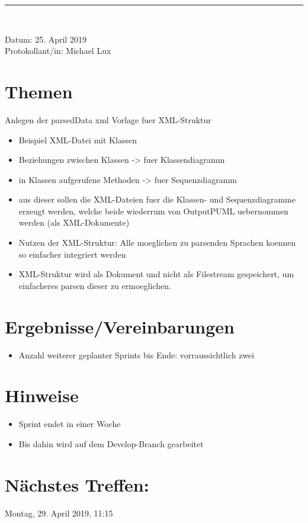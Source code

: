 \pagebreak
\begin{center}  
\vspace{0.5pt}\nointerlineskip\rule{\textwidth}{0.2pt}\\ 
\vspace{0.5pt}\nointerlineskip
\end{center} 
\large Datum: 25. April 2019\vspace{3pt}\\\large Protokollant/in: Michael Lux
\section{Themen}
Anlegen der parsedData xml Vorlage fuer XML-Struktur
\begin{itemize}

\item Beispiel XML-Datei mit Klassen
\item Beziehungen zwischen Klassen -> fuer Klassendiagramm
\item in Klassen aufgerufene Methoden -> fuer Sequenzdiagramm

\item aus dieser sollen die XML-Dateien fuer die Klassen- und Sequenzdiagramme erzeugt werden, welche beide wiederrum von OutputPUML uebernommen werden (als XML-Dokumente)

\item Nutzen der XML-Struktur: Alle moeglichen zu parsenden Sprachen koennen so einfacher integriert werden 

\item XML-Struktur wird als Dokument und nicht als Filestream gespeichert, um einfacheres parsen dieser zu ermoeglichen.



\end{itemize}


\section{Ergebnisse/Vereinbarungen}
\begin{itemize}
\item Anzahl weiterer geplanter Sprints bis Ende: vorraussichtlich zwei
\end{itemize}
\section{Hinweise}
\begin{itemize}
\item Sprint endet in einer Woche
\item Bis dahin wird auf dem Develop-Branch gearbeitet
\end{itemize}
\section*{Nächstes Treffen:}
Montag, 29. April 2019, 11:15




